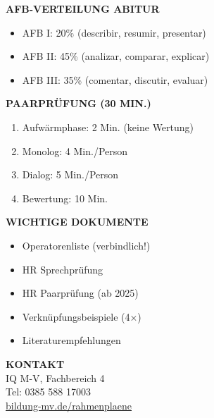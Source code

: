 \documentclass[11pt,a4paper]{article}
\begin{document}
\begin{minipage}[t]{0.48\textwidth}
\textbf{\color{mainblue}AFB-VERTEILUNG ABITUR}
\begin{itemize}[leftmargin=0.3cm, itemsep=1pt, topsep=2pt]
\item AFB I: 20\% (describir, resumir, presentar)
\item AFB II: 45\% (analizar, comparar, explicar)
\item AFB III: 35\% (comentar, discutir, evaluar)
\end{itemize}

\vspace{0.2cm}
\textbf{\color{mainblue}PAARPRÜFUNG (30 MIN.)}
\begin{enumerate}[leftmargin=0.5cm, itemsep=1pt, topsep=2pt]
\item Aufwärmphase: 2 Min. (keine Wertung)
\item Monolog: 4 Min./Person
\item Dialog: 5 Min./Person
\item Bewertung: 10 Min.
\end{enumerate}

\vspace{0.2cm}
\textbf{\color{mainblue}WICHTIGE DOKUMENTE}
\begin{itemize}[leftmargin=0.3cm, itemsep=1pt, topsep=2pt]
\item Operatorenliste (verbindlich!)
\item HR Sprechprüfung
\item HR Paarprüfung (ab 2025)
\item Verknüpfungsbeispiele (4×)
\item Literaturempfehlungen
\end{itemize}

\vspace{0.2cm}
\textbf{\color{mainblue}KONTAKT}\\
IQ M-V, Fachbereich 4\\
Tel: 0385 588 17003\\
\url{bildung-mv.de/rahmenplaene}
\end{minipage}

\vspace{0.5cm}
\begin{center}
\end{center}
\end{document}
